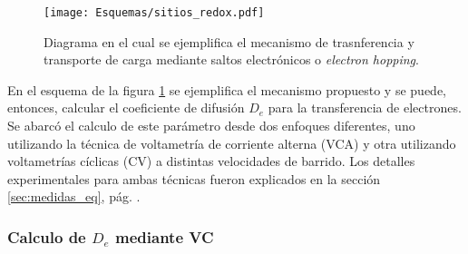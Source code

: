 	 		\begin{figure}[ht!]
					\centering
			 	    \texttt{[image: Esquemas/sitios\_redox.pdf]}
			        \caption[Mecanismo de transferencia de electrones]{Diagrama en el cual se ejemplifica el mecanismo de trasnferencia y transporte de carga mediante saltos electrónicos o \textit{electron hopping}.}
			        \label{fig:sitios_redox}
			      	\end{figure} 	
	
	 En el esquema de la figura \ref{fig:sitios_redox} se ejemplifica el mecanismo propuesto y se puede, entonces, calcular el coeficiente de difusión $D_e$ para la transferencia de electrones. Se abarcó el calculo de este parámetro desde dos enfoques diferentes, uno utilizando la técnica de voltametría de corriente alterna (VCA) y otra utilizando voltametrías cíclicas (CV) a distintas velocidades de barrido. Los detalles experimentales para ambas técnicas fueron explicados en la sección \ref{sec:medidas_eq}, pág. \pageref{sec:medidas_eq}.
	  
	 \subsubsection*{Calculo de $D_e$ mediante VC}	
	 
